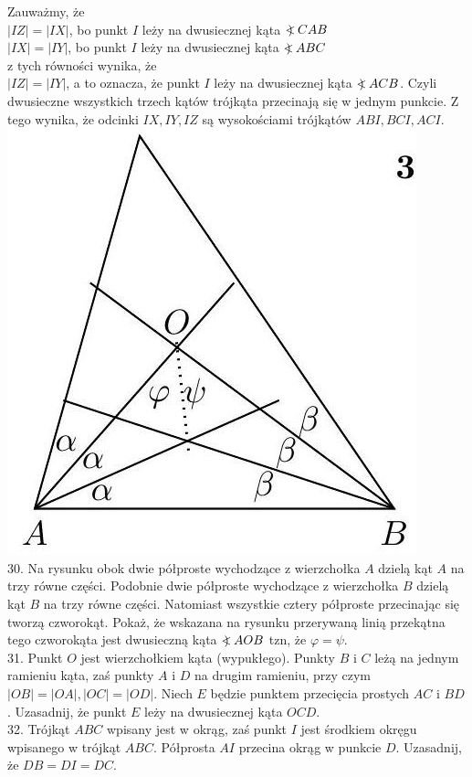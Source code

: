 \documentclass[10pt]{article}
\newcommand\Varangle{\mathop{{<\!\!\!\!\!\text{\small)}}\:}\nolimits}
\begin{document}
Zauważmy, że\\
\(|I Z|=|I X|\), bo punkt \(I\) leży na dwusiecznej kąta \(\Varangle C A B\)\\
\(|I X|=|I Y|\), bo punkt \(I\) leży na dwusiecznej kąta \(\Varangle A B C\)\\
z tych równości wynika, że\\
\(|I Z|=|I Y|\), a to oznacza, że punkt \(I\) leży na dwusiecznej kąta \(\Varangle A C B\). Czyli dwusieczne wszystkich trzech kątów trójkąta przecinają się w jednym punkcie. Z tego wynika, że odcinki \(I X, I Y, I Z\) są wysokościami trójkątów \(A B I, B C I, A C I\).\\
\includegraphics[max width=\textwidth, center]{2024_11_21_e9b4faa005d5be2cc318g-038}\\
30. Na rysunku obok dwie półproste wychodzące z wierzchołka \(A\) dzielą kąt \(A\) na trzy równe części. Podobnie dwie półproste wychodzące z wierzchołka \(B\) dzielą kąt \(B\) na trzy równe części. Natomiast wszystkie cztery półproste przecinając się tworzą czworokąt. Pokaż, że wskazana na rysunku przerywaną linią przekątna tego czworokąta jest dwusieczną kąta \(\Varangle A O B\) tzn, że \(\varphi=\psi\).\\
31. Punkt \(O\) jest wierzchołkiem kąta (wypukłego). Punkty \(B\) i \(C\) leżą na jednym ramieniu kąta, zaś punkty \(A\) i \(D\) na drugim ramieniu, przy czym \(|O B|=|O A|,|O C|=|O D|\). Niech \(E\) będzie punktem przecięcia prostych \(A C\) i \(B D\). Uzasadnij, że punkt \(E\) leży na dwusiecznej kąta \(O C D\).\\
32. Trójkąt \(A B C\) wpisany jest w okrąg, zaś punkt \(I\) jest środkiem okręgu wpisanego w trójkąt \(A B C\). Półprosta \(A I\) przecina okrąg w punkcie \(D\). Uzasadnij, że \(D B=D I=D C\).
\end{document}
